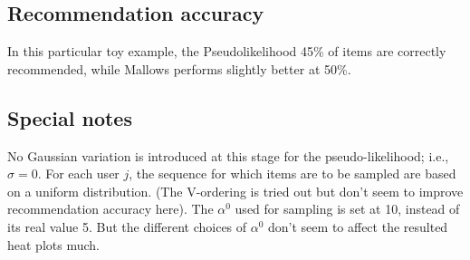 \documentclass[11pt, oneside]{article}   	%
\begin{document}
\subsection{Recommendation accuracy}
In this particular toy example, the Pseudolikelihood 45\% of items are correctly recommended, while Mallows performs slightly better at 50\%.
\subsection{Special notes}
No Gaussian variation is introduced at this stage for the pseudo-likelihood; i.e., $\sigma = 0$. For each user $j$, the sequence for which items are to be sampled are based on a uniform distribution. (The V-ordering is tried out but don't seem to improve recommendation accuracy here). The $\alpha^0$ used for sampling is set at 10, instead of its real value 5. But the different choices of $\alpha^0$ don't seem to affect the resulted heat plots much.
\end{document}

